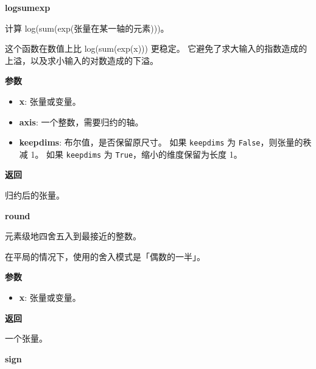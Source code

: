 \textbf{logsumexp}\label{logsumexp}

\begin{Shaded}
\begin{Highlighting}[]
\OperatorTok{=}\OperatorTok{=}\NormalTok{)}
\end{Highlighting}
\end{Shaded}

计算 log(sum(exp(张量在某一轴的元素)))。

这个函数在数值上比 log(sum(exp(x))) 更稳定。
它避免了求大输入的指数造成的上溢，以及求小输入的对数造成的下溢。

\textbf{参数}

\begin{itemize}
\tightlist
\item
  \textbf{x}: 张量或变量。
\item
  \textbf{axis}: 一个整数，需要归约的轴。
\item
  \textbf{keepdims}: 布尔值，是否保留原尺寸。 如果 \texttt{keepdims} 为
  \texttt{False}，则张量的秩减 1。 如果 \texttt{keepdims} 为
  \texttt{True}，缩小的维度保留为长度 1。
\end{itemize}

\textbf{返回}

归约后的张量。


\textbf{round}\label{round}

\begin{Shaded}
\begin{Highlighting}[]
\end{Highlighting}
\end{Shaded}

元素级地四舍五入到最接近的整数。

在平局的情况下，使用的舍入模式是「偶数的一半」。

\textbf{参数}

\begin{itemize}
\tightlist
\item
  \textbf{x}: 张量或变量。
\end{itemize}

\textbf{返回}

一个张量。


\textbf{sign}\label{sign}

\begin{Shaded}
\begin{Highlighting}[]
\end{Highlighting}
\end{Shaded}

